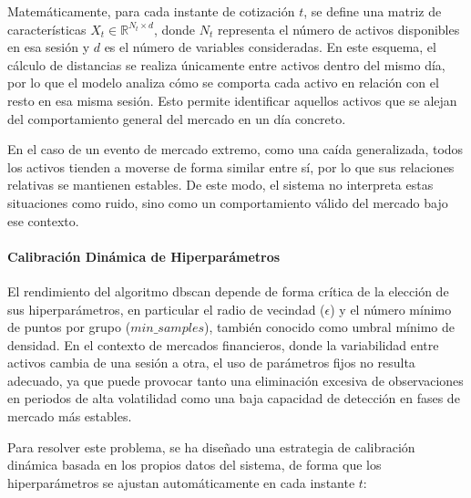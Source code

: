 \documentclass[
]{article}
\begin{document}
Matemáticamente, para cada instante de cotización $t$, se define una matriz de características $X_t \in \mathbb{R}^{N_t \times d}$, donde $N_t$ representa el número de activos disponibles en esa sesión y $d$ es el número de variables consideradas.
En este esquema, el cálculo de distancias se realiza únicamente entre activos dentro del mismo día, por lo que el modelo analiza cómo se comporta cada activo en relación con el resto en esa misma sesión. Esto permite identificar aquellos activos que se alejan del comportamiento general del mercado en un día concreto.

En el caso de un evento de mercado extremo, como una caída generalizada, todos los activos tienden a moverse de forma similar entre sí, por lo que sus relaciones relativas se mantienen estables. De este modo, el sistema no interpreta estas situaciones como ruido, sino como un comportamiento válido del mercado bajo ese contexto.

\paragraph{Calibración Dinámica de Hiperparámetros}

El rendimiento del algoritmo \gls{dbscan} depende de forma crítica de la elección de sus hiperparámetros, en particular el radio de vecindad ($\epsilon$) y el número mínimo de puntos por grupo ($min\_samples$), también conocido como umbral mínimo de densidad. En el contexto de mercados financieros, donde la variabilidad entre activos cambia de una sesión a otra, el uso de parámetros fijos no resulta adecuado, ya que puede provocar tanto una eliminación excesiva de observaciones en periodos de alta volatilidad como una baja capacidad de detección en fases de mercado más estables.

Para resolver este problema, se ha diseñado una estrategia de calibración dinámica basada en los propios datos del sistema, de forma que los hiperparámetros se ajustan automáticamente en cada instante $t$:
\end{document}
